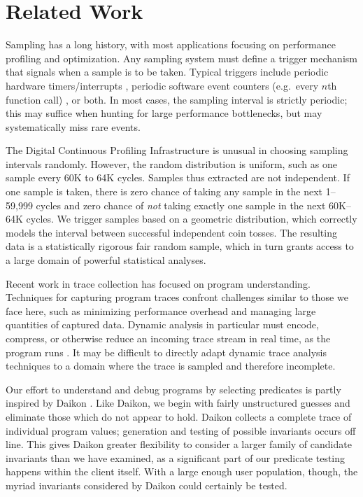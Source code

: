 \section{Related Work}
\label{sec:related-work}

Sampling has a long history, with most applications focusing on
performance profiling and optimization.  Any sampling system must
define a trigger mechanism that signals when a sample is to be taken.
Typical triggers include periodic hardware timers/interrupts
\cite{Burrows:2000:EFV,Traub:200:EILPP,Whaley:337483}, periodic
software event counters (e.g.\ every $n$th function call)
\cite{Arnold:2000:ACCTS}, or both.  In most cases, the sampling
interval is strictly periodic; this may suffice when hunting for large
performance bottlenecks, but may systematically miss rare events.

The Digital Continuous Profiling Infrastructure
\cite{Anderson:1997:CPW} is unusual in choosing sampling intervals
randomly.  However, the random distribution is uniform, such as one
sample every 60K to 64K cycles.  Samples thus extracted are not
independent.  If one sample is taken, there is zero chance of taking
any sample in the next 1--59,999 cycles and zero chance of \emph{not}
taking exactly one sample in the next 60K--64K cycles.  We trigger
samples based on a geometric distribution, which correctly models the
interval between successful independent coin tosses.  The resulting data is a
statistically rigorous fair random sample, which in turn grants access
to a large domain of powerful statistical analyses.

Recent work in trace collection has focused on program understanding.
Techniques for capturing program traces confront challenges similar to
those we face here, such as minimizing performance overhead and
managing large quantities of captured data.  Dynamic analysis in
particular must encode, compress, or otherwise reduce an incoming
trace stream in real time, as the program runs
\cite{Demsky:RBEOOP:2002,ICSE01*221}.  It may be difficult to directly
adapt dynamic trace analysis techniques to a domain where the trace is
sampled and therefore incomplete.  

Our effort to understand and debug programs by selecting predicates is
partly inspired by Daikon \cite{ernst2001}.  Like Daikon, we begin
with fairly unstructured guesses and eliminate those which do not
appear to hold.  Daikon collects a complete trace of individual
program values; generation and testing of possible invariants occurs
off line.  This gives Daikon greater flexibility to consider a
larger family of candidate invariants than we have examined, as a
significant part of our predicate testing happens within the client
itself.  With a large enough user population, though, the myriad
invariants considered by Daikon could certainly be tested.

